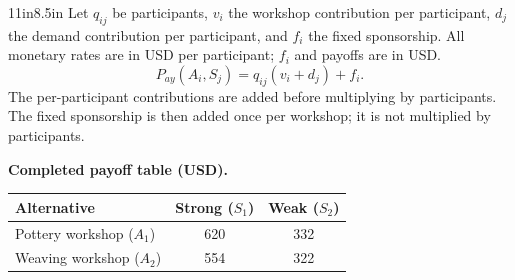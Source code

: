 \begin{CalculationLandscape}{11in}{8.5in}
Let $q_{ij}$ be participants, $v_i$ the workshop contribution per participant,
$d_j$ the demand contribution per participant, and $f_i$ the fixed sponsorship.
All monetary rates are in USD per participant; $f_i$ and payoffs are in USD.
\[
P_{ay}(A_i,S_j)=q_{ij}(v_i+d_j)+f_i.
\]
The per-participant contributions are added before multiplying by participants.
The fixed sponsorship is then added once per workshop; it is not multiplied by participants.

\textbf{Completed payoff table (USD).}
\begin{center}
\begin{tabular}{@{}lcc@{}}\toprule
Alternative & Strong ($S_1$) & Weak ($S_2$)\\\midrule
Pottery workshop ($A_1$) & 620 & 332\\
Weaving workshop ($A_2$) & 554 & 322\\
\bottomrule\end{tabular}
\end{center}
\end{CalculationLandscape}

